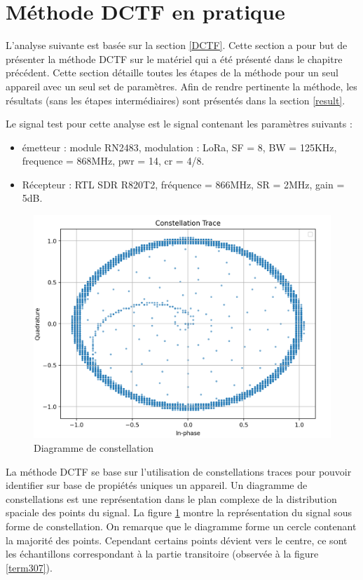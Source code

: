  
\section{Méthode DCTF en pratique}\label{pra}

L'analyse suivante est basée sur la section \ref{DCTF}. Cette section a pour but de présenter la méthode \ac{DCTF} sur le matériel qui a été présenté dans le chapitre précédent. Cette section détaille toutes les étapes de la méthode pour un seul appareil avec un seul set de paramètres. Afin de rendre pertinente la méthode, les résultats (sans les étapes intermédiaires) sont présentés dans la section \ref{result}.

Le signal test pour cette analyse est le signal contenant les paramètres suivants :

\vspace{0.1cm}

\begin{itemize}
\item émetteur : module RN2483, modulation : LoRa, SF = 8, BW = 125KHz, frequence = 868MHz, pwr = 14, cr = 4/8.
\item Récepteur : RTL SDR R820T2, fréquence = 866MHz, SR = 2MHz, gain = 5dB.
\end{itemize}

\begin{figure}[h]
\centering

\includegraphics[scale=0.25]{images/dctf1.png}
\caption{Diagramme de constellation}\label{term314}
\end{figure}


La méthode \ac{DCTF} se base sur l'utilisation de constellations traces pour pouvoir identifier sur base de propiétés uniques un appareil. Un diagramme de constellations est une représentation dans le plan complexe de la distribution spaciale des points du signal. La figure \ref{term314} montre la représentation  du signal sous forme de constellation. On remarque que le diagramme forme un cercle contenant la majorité des points. Cependant certains points dévient vers le centre, ce sont les échantillons correspondant à la partie transitoire (observée à la figure \ref{term307}).

